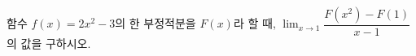 함수 $f(x)=2x^2-3$의 한 부정적분을 $F(x)$라 할 때, $\displaystyle\lim_{x\to 1}\dfrac{F(x^2)-F(1)}{x-1}$의 값을 구하시오.
